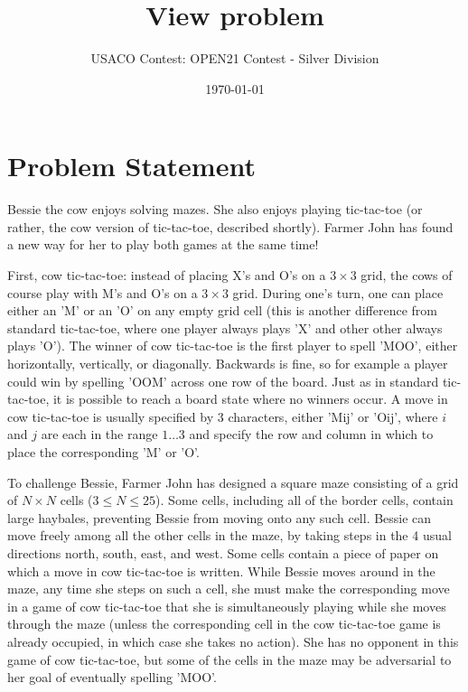 \documentclass[12pt]{article}
\title{View problem}
\author{USACO Contest: OPEN21 Contest - Silver Division}
\date{\today}
\begin{document}
\maketitle

\section*{Problem Statement}

Bessie the cow enjoys solving mazes.  She also enjoys playing tic-tac-toe (or
rather, the cow version of tic-tac-toe, described shortly).  Farmer John has
found a new way for her to play both games at the same time!

First, cow tic-tac-toe: instead of placing X's and O's on a $3 \times 3$ grid, 
the cows of course play with M's and O's on a $3 \times 3$ grid.   During one's
turn, one can place either an 'M' or an 'O' on any empty grid cell (this is
another difference from standard tic-tac-toe, where one player always plays 'X'
and other other always plays 'O').  The winner of cow tic-tac-toe is the first
player to spell 'MOO', either horizontally, vertically, or diagonally. 
Backwards is fine, so for example a player could win by spelling 'OOM' across
one row of the  board.  Just as in standard tic-tac-toe, it is possible to reach
a board state where no winners occur. A move in cow tic-tac-toe is usually
specified by  3 characters, either 'Mij' or 'Oij', where $i$ and $j$ are each in
the range $1 \ldots 3$ and specify the row and column in which to place the 
corresponding 'M' or 'O'.  

To challenge Bessie, Farmer John has designed a square maze consisting of a grid
of  $N \times N$ cells ($3 \leq N \leq 25$).  Some cells, including all of the
border cells, contain large haybales, preventing Bessie from moving onto any
such cell. Bessie can move freely among all the other cells in the maze, by
taking steps in the 4 usual directions north, south, east, and west.  Some cells
contain a piece of paper on which a move in cow tic-tac-toe is written.  While
Bessie moves around in the maze, any time she steps on such a cell, she must
make the corresponding move in a game of cow tic-tac-toe that she is
simultaneously playing while she moves through the maze (unless the
corresponding cell in the cow tic-tac-toe game is already occupied, in which
case she takes no action).   She has no opponent in this game of cow
tic-tac-toe, but some of the cells in the maze may be adversarial to her goal of
eventually spelling 'MOO'.
\end{document}
